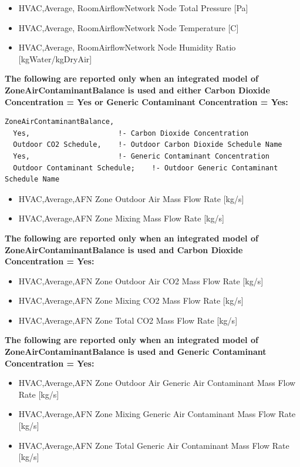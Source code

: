 \begin{itemize}
\item
  HVAC,Average, RoomAirflowNetwork Node Total Pressure {[}Pa{]}
\item
  HVAC,Average, RoomAirflowNetwork Node Temperature {[}C{]}
\item
  HVAC,Average, RoomAirflowNetwork Node Humidity Ratio {[}kgWater/kgDryAir{]}
\end{itemize}

\textbf{The following are reported only when an integrated model of ZoneAirContaminantBalance is used and either Carbon Dioxide Concentration = Yes or Generic Contaminant Concentration = Yes:}

\begin{lstlisting}
ZoneAirContaminantBalance,
  Yes,                     !- Carbon Dioxide Concentration
  Outdoor CO2 Schedule,    !- Outdoor Carbon Dioxide Schedule Name
  Yes,                     !- Generic Contaminant Concentration
  Outdoor Contaminant Schedule;    !- Outdoor Generic Contaminant Schedule Name
\end{lstlisting}

\begin{itemize}
\item
  HVAC,Average,AFN Zone Outdoor Air Mass Flow Rate {[}kg/s{]}
\item
  HVAC,Average,AFN Zone Mixing Mass Flow Rate {[}kg/s{]}

\end{itemize}

\textbf{The following are reported only when an integrated model of ZoneAirContaminantBalance is used and Carbon Dioxide Concentration = Yes:}

\begin{itemize}
\item
  HVAC,Average,AFN Zone Outdoor Air CO2 Mass Flow Rate {[}kg/s{]}
\item
  HVAC,Average,AFN Zone Mixing CO2 Mass Flow Rate {[}kg/s{]}
\item
  HVAC,Average,AFN Zone Total CO2 Mass Flow Rate {[}kg/s{]}
\end{itemize}

\textbf{The following are reported only when an integrated model of ZoneAirContaminantBalance is used and Generic Contaminant Concentration = Yes:}

\begin{itemize}
\item
  HVAC,Average,AFN Zone Outdoor Air Generic Air Contaminant Mass Flow Rate {[}kg/s{]}
\item
  HVAC,Average,AFN Zone Mixing Generic Air Contaminant Mass Flow Rate {[}kg/s{]}
\item
  HVAC,Average,AFN Zone Total Generic Air Contaminant Mass Flow Rate {[}kg/s{]}

\end{itemize}

